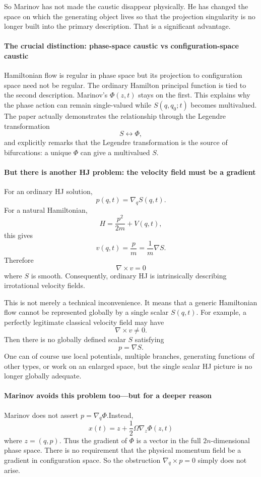 So Marinov has not made the caustic disappear physically. He has changed the
space on which the generating object lives so that the projection singularity
is no longer built into the primary description.
That is a significant advantage.

\paragraph{ The crucial distinction: phase-space caustic vs configuration-space caustic}
Hamiltonian flow is regular in phase space but 
its projection to configuration space need not be regular.
The ordinary Hamilton principal function is tied to the second description.
Marinov's \(\Phi(z,t)\) stays on the first.
This explains why the phase action can remain single-valued while
\(S(q,q_0;t)\) becomes multivalued.
The paper actually demonstrates the relationship through the Legendre
transformation
$$ S \longleftrightarrow \Phi, $$
and explicitly remarks that the Legendre transformation is the source of
bifurcations: a unique \(\Phi\) can give a multivalued \(S\).

\paragraph{ But there is another HJ problem: the velocity field must be a gradient}
For an ordinary HJ solution,
$$ p(q,t)=\nabla_q S(q,t). $$
For a natural Hamiltonian,
$$ H=\frac{p^2}{2m}+V(q,t), $$
this gives
$$ v(q,t) = \frac{p}{m} = \frac{1}{m}\nabla S. $$
Therefore
$$ \nabla\times v=0 $$
where \(S\) is smooth.
Consequently, ordinary HJ is intrinsically describing irrotational velocity
fields.

This is not merely a technical inconvenience. It means that a generic
Hamiltonian flow cannot be represented globally by a single scalar \(S(q,t)\).
For example, a perfectly legitimate classical velocity field may have
$$ \nabla\times v\neq0. $$
Then there is no globally defined scalar \(S\) satisfying
$$ p=\nabla S. $$
One can of course use local potentials, multiple branches, generating functions
of other types, or work on an enlarged space, but the single scalar HJ picture
is no longer globally adequate.

 \paragraph{Marinov avoids this problem too—but for a deeper reason}
Marinov does not assert $ p=\nabla_q \Phi$.Instead,
$$ \boxed{ x(t)=z+\frac12\Omega\nabla_z\Phi(z,t) } $$
where \(z=(q,p)\).
Thus the gradient of \(\Phi\) is a vector in the full \(2n\)-dimensional phase
space.
There is no requirement that the physical momentum field be a gradient in
configuration space.
So the obstruction $ \nabla_q\times p=0 $ simply does not arise.

